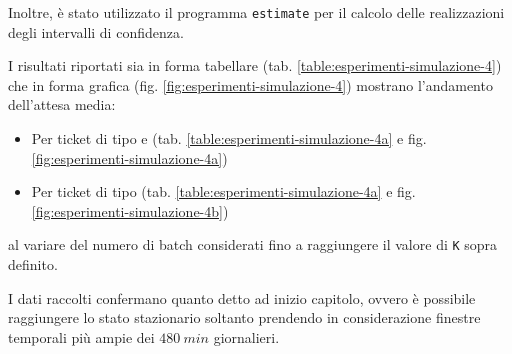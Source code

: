 Inoltre, è stato utilizzato il programma \texttt{estimate} per il calcolo delle realizzazioni degli intervalli di confidenza.

I risultati riportati sia in forma tabellare (tab. \ref{table:esperimenti-simulazione-4}) che in forma grafica (fig. \ref{fig:esperimenti-simulazione-4}) mostrano l'andamento dell'attesa media:
\begin{itemize}
\item Per ticket di tipo \uo{} e \pp{} (tab. \ref{table:esperimenti-simulazione-4a} e fig. \ref{fig:esperimenti-simulazione-4a})
\item Per ticket di tipo \sr{} (tab. \ref{table:esperimenti-simulazione-4a} e fig. \ref{fig:esperimenti-simulazione-4b})
\end{itemize}
al variare del numero di batch considerati fino a raggiungere il valore di \texttt{K} sopra definito.

I dati raccolti confermano quanto detto ad inizio capitolo, ovvero è possibile raggiungere lo stato stazionario soltanto prendendo in considerazione finestre temporali più ampie dei $480\ min$ giornalieri.

